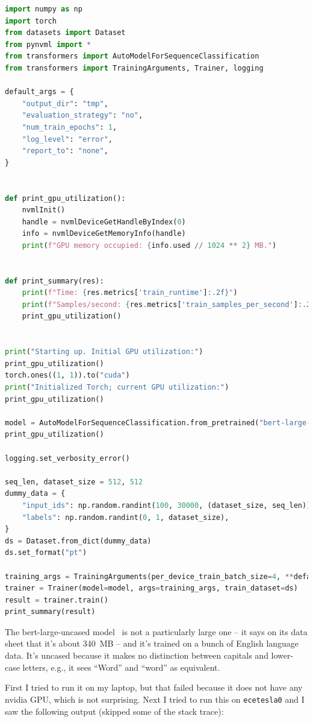 \documentclass[a4paper]{report}
\begin{document}
\begin{lstlisting}[language=python]
import numpy as np
import torch
from datasets import Dataset
from pynvml import *
from transformers import AutoModelForSequenceClassification
from transformers import TrainingArguments, Trainer, logging

default_args = {
    "output_dir": "tmp",
    "evaluation_strategy": "no",
    "num_train_epochs": 1,
    "log_level": "error",
    "report_to": "none",
}


def print_gpu_utilization():
    nvmlInit()
    handle = nvmlDeviceGetHandleByIndex(0)
    info = nvmlDeviceGetMemoryInfo(handle)
    print(f"GPU memory occupied: {info.used // 1024 ** 2} MB.")


def print_summary(res):
    print(f"Time: {res.metrics['train_runtime']:.2f}")
    print(f"Samples/second: {res.metrics['train_samples_per_second']:.2f}")
    print_gpu_utilization()


print("Starting up. Initial GPU utilization:")
print_gpu_utilization()
torch.ones((1, 1)).to("cuda")
print("Initialized Torch; current GPU utilization:")
print_gpu_utilization()

model = AutoModelForSequenceClassification.from_pretrained("bert-large-uncased").to("cuda")
print_gpu_utilization()

logging.set_verbosity_error()

seq_len, dataset_size = 512, 512
dummy_data = {
    "input_ids": np.random.randint(100, 30000, (dataset_size, seq_len)),
    "labels": np.random.randint(0, 1, dataset_size),
}
ds = Dataset.from_dict(dummy_data)
ds.set_format("pt")

training_args = TrainingArguments(per_device_train_batch_size=4, **default_args)
trainer = Trainer(model=model, args=training_args, train_dataset=ds)
result = trainer.train()
print_summary(result)
\end{lstlisting}

The bert-large-uncased model~\cite{bert} is not a particularly large one -- it says on its data sheet that it's about 340~MB -- and it's trained on a bunch of English language data. It's uncased because it makes no distinction between capitals and lower-case letters, e.g., it sees ``Word'' and ``word'' as equivalent.

First I tried to run it on my laptop, but that failed because it does not have any nvidia GPU, which is not surprising. Next I tried to run this on \texttt{ecetesla0} and I saw the following output (skipped some of the stack trace):
\end{document}
